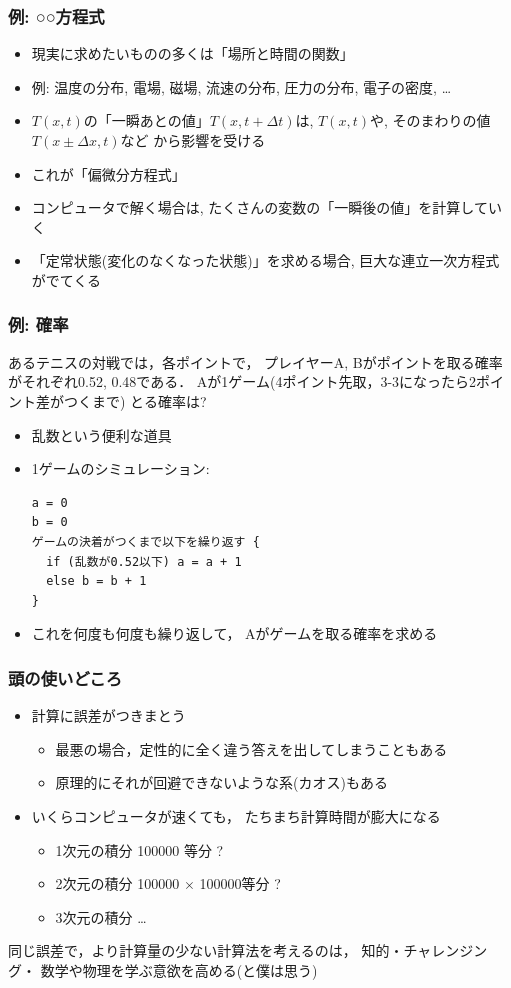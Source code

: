 \documentclass[12pt,dvipdfmx]{beamer}
\newcommand{\aka}[1]{{\color{red}#1}}
\begin{document}
\begin{frame}[fragile]
\frametitle{例: ○○方程式}
\begin{itemize}
\item 現実に求めたいものの多くは「場所と時間の関数」
\item 例: 温度の分布, 電場, 磁場, 流速の分布, 圧力の分布, 電子の密度, \ldots
\item $T(x, t)$の「一瞬あとの値」$T(x, t+\Delta t)$は, 
  $T(x, t)$や, そのまわりの値$T(x\pm \Delta x, t)$など
  から影響を受ける
\item これが「偏微分方程式」
\item コンピュータで解く場合は, たくさんの変数の「一瞬後の値」を計算していく
\item 「定常状態(変化のなくなった状態)」を求める場合, 
  巨大な連立一次方程式がでてくる
\end{itemize}
\end{frame}

\begin{frame}[fragile]
\frametitle{例: 確率}
あるテニスの対戦では，各ポイントで，
プレイヤーA, Bがポイントを取る確率がそれぞれ0.52, 0.48である．
Aが1ゲーム(4ポイント先取，3-3になったら2ポイント差がつくまで)
とる確率は? 

\begin{itemize}
\item 乱数という便利な道具
\item 1ゲームのシミュレーション:
\begin{lstlisting}
a = 0
b = 0
ゲームの決着がつくまで以下を繰り返す {
  if (乱数が0.52以下) a = a + 1
  else b = b + 1
}
\end{lstlisting}
\item これを何度も何度も繰り返して，
Aがゲームを取る確率を求める
\end{itemize}
\end{frame}

\begin{frame}
\frametitle{頭の使いどころ}

\begin{itemize}
\item 計算に誤差がつきまとう
  \begin{itemize}
  \item 最悪の場合，定性的に全く違う答えを出してしまうこともある
  \item 原理的にそれが回避できないような系(カオス)もある
  \end{itemize}
\item いくらコンピュータが速くても，
  たちまち計算時間が膨大になる
  \begin{itemize}
  \item 1次元の積分 100000 等分 ?
  \item 2次元の積分 100000 $\times$ 100000等分 ?
  \item 3次元の積分 \ldots 
  \end{itemize}
\end{itemize}

同じ誤差で，より計算量の少ない計算法を考えるのは，
知的・チャレンジング・
\aka{数学や物理を学ぶ意欲を高める{\tiny (と僕は思う)}}

\end{frame}
\end{document}
